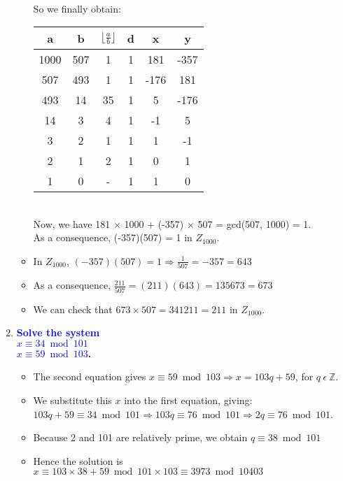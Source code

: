 \documentclass[11pt]{article}
\begin{document}
\begin{enumerate}
\begin{itemize}
\begin{center}
\begin{tabular}{| c | c | c | c | c | c |}
            \hline
            \end{tabular}
            \end{center}
            \\ So we finally obtain: \\
            \begin{center}
            \begin{tabular}{| c | c | c | c | c | c |} 
            \hline
            a & b & ${\lfloor}\frac{a}{b}{\rfloor}$ & d & x & y \\
            \hline
            1000 & 507 & 1 & 1 & 181 & -357 \\
            507 & 493 & 1 & 1 & -176 & 181 \\
            493 & 14 & 35 & 1 & 5 & -176 \\
            14 & 3 & 4 & 1 & -1 & 5 \\
            3 & 2 & 1 & 1 & 1 & -1 \\
            2 & 1 & 2 & 1 & 0 & 1 \\
            1 & 0 & - & 1 & 1 & 0 \\
            \hline
            \end{tabular}
            \end{center}
            \\ Now, we have 181 $\times$ 1000 + (-357) $\times$ 507 = gcd(507, 1000) = 1.
            \\ As a consequence, (-357)(507) = 1 in $Z_{1000}$.
        \item In $Z_{1000}$, $(-357)(507) = 1 \Rightarrow \frac{1}{507} = -357 = 643$
        \item As a consequence, $\frac{211}{507} = (211)(643) = 135673 = 673$
        \item We can check that $673 \times 507 = 341211 = 211$ in $Z_{1000}$.
    \end{itemize}

    

\item \textbf{\textcolor{blue}{Solve the system \\ $x\equiv 34 \bmod{101}$\\ $x\equiv 59 \bmod{103}$.}}
    \begin{itemize}
        \item The second equation gives $x \equiv 59 \bmod{103} \Rightarrow x = 103q + 59$, for $q\ \epsilon\ \mathbb{Z}$.
        \item We substitute this $x$ into the first equation, giving: $103q + 59 \equiv 34 \bmod{101} \Rightarrow 103q \equiv 76 \bmod{101} \Rightarrow 2q \equiv 76 \bmod{101}$.
        \item Because 2 and 101 are relatively prime, we obtain $q \equiv 38 \bmod{101}$
        \item Hence the solution is $x \equiv 103 \times 38 + 59 \bmod{101 \times 103} \equiv 3973 \bmod{10403}$
    \end{itemize}


\end{enumerate}
\end{document}
